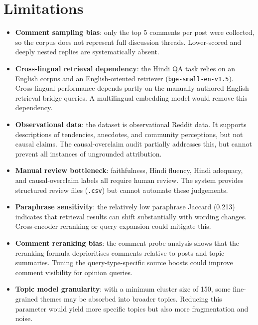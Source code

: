\documentclass[11pt,a4paper]{article}
\begin{document}
\section{Limitations}
\label{sec:limitations}

\begin{itemize}[leftmargin=*]
  \item \textbf{Comment sampling bias}: only the top 5 comments per post were collected, so the corpus does not represent full discussion threads. Lower-scored and deeply nested replies are systematically absent.
  
  \item \textbf{Cross-lingual retrieval dependency}: the Hindi QA task relies on an English corpus and an English-oriented retriever (\texttt{bge-small-en-v1.5}). Cross-lingual performance depends partly on the manually authored English retrieval bridge queries. A multilingual embedding model would remove this dependency.
  
  \item \textbf{Observational data}: the dataset is observational Reddit data. It supports descriptions of tendencies, anecdotes, and community perceptions, but not causal claims. The causal-overclaim audit partially addresses this, but cannot prevent all instances of ungrounded attribution.
  
  \item \textbf{Manual review bottleneck}: faithfulness, Hindi fluency, Hindi adequacy, and causal-overclaim labels all require human review. The system provides structured review files (\texttt{.csv}) but cannot automate these judgements.
  
  \item \textbf{Paraphrase sensitivity}: the relatively low paraphrase Jaccard (0.213) indicates that retrieval results can shift substantially with wording changes. Cross-encoder reranking or query expansion could mitigate this.
  
  \item \textbf{Comment reranking bias}: the comment probe analysis shows that the reranking formula deprioritises comments relative to posts and topic summaries. Tuning the query-type-specific source boosts could improve comment visibility for opinion queries.
  
  \item \textbf{Topic model granularity}: with a minimum cluster size of 150, some fine-grained themes may be absorbed into broader topics. Reducing this parameter would yield more specific topics but also more fragmentation and noise.


\end{itemize}
\end{document}
